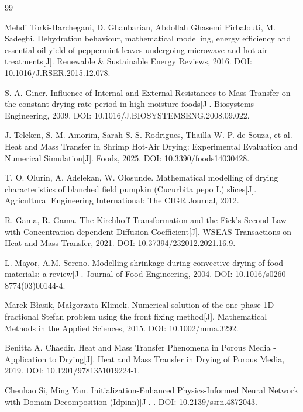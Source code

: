 \documentclass[withoutpreface,bwprint]{cumcmthesis}
\begin{document}

\begin{thebibliography}{99}

 Mehdi Torki-Harchegani, D. Ghanbarian, Abdollah Ghasemi Pirbalouti, M. Sadeghi. Dehydration behaviour, mathematical modelling, energy efficiency and essential oil yield of peppermint leaves undergoing microwave and hot air treatments[J]. Renewable \& Sustainable Energy Reviews, 2016. DOI: 10.1016/J.RSER.2015.12.078.

 S. A. Giner. Influence of Internal and External Resistances to Mass Transfer on the constant drying rate period in high-moisture foods[J]. Biosystems Engineering, 2009. DOI: 10.1016/J.BIOSYSTEMSENG.2008.09.022.

 J. Teleken, S. M. Amorim, Sarah S. S. Rodrigues, Thailla W. P. de Souza, et al. Heat and Mass Transfer in Shrimp Hot-Air Drying: Experimental Evaluation and Numerical Simulation[J]. Foods, 2025. DOI: 10.3390/foods14030428.

 T. O. Olurin, A. Adelekan, W. Olosunde. Mathematical modelling of drying characteristics of blanched field pumpkin (Cucurbita pepo L) slices[J]. Agricultural Engineering International: The CIGR Journal, 2012.

 R. Gama, R. Gama. The Kirchhoff Transformation and the Fick's Second Law with Concentration-dependent Diffusion Coefficient[J]. WSEAS Transactions on Heat and Mass Transfer, 2021. DOI: 10.37394/232012.2021.16.9.

 L. Mayor, A.M. Sereno. Modelling shrinkage during convective drying of food materials: a review[J]. Journal of Food Engineering, 2004. DOI: 10.1016/s0260-8774(03)00144-4.

 Marek Błasik, Małgorzata Klimek. Numerical solution of the one phase 1D fractional Stefan problem using the front fixing method[J]. Mathematical Methods in the Applied Sciences, 2015. DOI: 10.1002/mma.3292.

 Benitta A. Chaedir. Heat and Mass Transfer Phenomena in Porous Media - Application to Drying[J]. Heat and Mass Transfer in Drying of Porous Media, 2019. DOI: 10.1201/9781351019224-1.

 Chenhao Si, Ming Yan. Initialization-Enhanced Physics-Informed Neural Network with Domain Decomposition (Idpinn)[J]. . DOI: 10.2139/ssrn.4872043.


\end{thebibliography}
\end{document}
